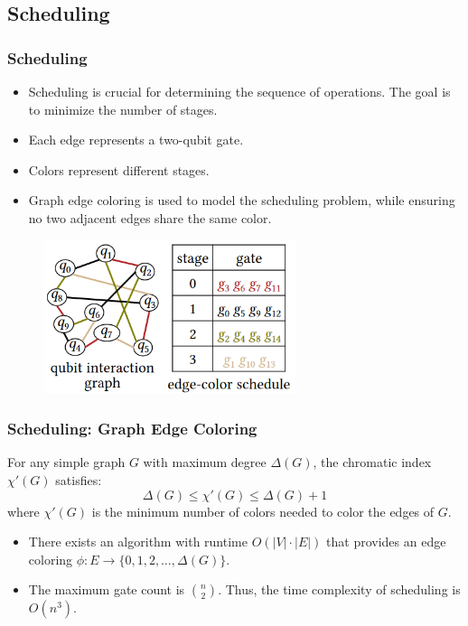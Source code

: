 \documentclass[18 pt]{beamer}
\begin{document}
\subsection{Scheduling}
\begin{frame}
    \frametitle{Scheduling}
    \begin{itemize}
        \item Scheduling is crucial for determining the sequence of operations. The goal is to minimize the number of stages.
        \item Each edge represents a two-qubit gate.
        \item Colors represent different stages.
        \item  Graph edge coloring is used to model the scheduling problem, while ensuring no two adjacent edges share the same color.
    \end{itemize}
    \begin{figure}
        \includegraphics[height=4.5cm]{color.png}
    \end{figure}
    
\end{frame}

\begin{frame}
    \frametitle{Scheduling: Graph Edge Coloring}
    \begin{theorem}
    For any simple graph \( G \) with maximum degree \( \Delta(G) \), the chromatic index \(\chi'(G)\) satisfies:
\[
\Delta(G) \leq \chi'(G) \leq \Delta(G) + 1
\]
where \(\chi'(G)\) is the minimum number of colors needed to color the edges of \( G \).

    \end{theorem}
    \begin{itemize}
        \item There exists an algorithm with runtime \( O(|V| \cdot |E|) \) that provides an edge coloring \(\phi: E \to \{0, 1, 2, \dots, \Delta(G)\}\).
        \item The maximum gate count is \( \binom{n}{2} \). Thus, the time complexity of scheduling is \( O(n^3) \).
    \end{itemize}    
\end{frame}
\end{document}
